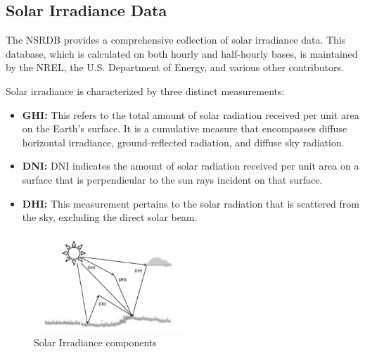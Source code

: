 \documentclass[a4paper,12pt]{Classes/RoboticsLaTeX}
\begin{document}
	\subsection{ Solar Irradiance Data}

	The \ac{NSRDB} provides a comprehensive collection of solar irradiance data. This database, which is calculated on both hourly and 
	half-hourly bases, is maintained by the \ac{NREL}, the U.S. Department of Energy, and various other contributors\cite{sengupta2018}. 

	Solar irradiance is characterized by three distinct measurements:

	\begin{itemize}
		\item \textbf{\ac{GHI}:} This refers to the total amount of solar radiation received per unit area on the Earth's surface. It is a cumulative measure that encompasses diffuse horizontal irradiance, ground-reflected radiation, and diffuse sky radiation.
		
		\item \textbf{\ac{DNI}:} \ac{DNI} indicates the amount of solar radiation received per unit area on a surface that is perpendicular to the sun rays incident on that surface.
		
		\item \textbf{\ac{DHI}:} This measurement pertains to the solar radiation that is scattered from the sky, excluding the direct solar beam.
	\end{itemize}

	\begin{figure}[H]
		\centering
		\includegraphics[width=0.5\textwidth]{Figures/Solar Irradiance.png} %
		\caption{Solar Irradiance components\cite{vignola2023}}
		\label{fig:my_label3} %
	\end{figure}
\end{document}
